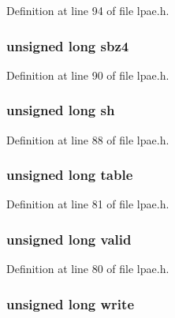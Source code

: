 \-Definition at line 94 of file lpae.\-h.

\hypertarget{structlpae__p2m__t_a38ba2ebd33232186b46dd6c586cdef25}{
\subsubsection[{sbz4}]{\setlength{\rightskip}{0pt plus 5cm}unsigned long {\bf sbz4}}}\label{structlpae__p2m__t_a38ba2ebd33232186b46dd6c586cdef25}


\-Definition at line 90 of file lpae.\-h.

\hypertarget{structlpae__p2m__t_a8388cd14eb45903279fca66cedfa5ec7}{
\subsubsection[{sh}]{\setlength{\rightskip}{0pt plus 5cm}unsigned long {\bf sh}}}\label{structlpae__p2m__t_a8388cd14eb45903279fca66cedfa5ec7}


\-Definition at line 88 of file lpae.\-h.

\hypertarget{structlpae__p2m__t_afe6d8cf4d4c78126d82831e6d5ef5483}{
\subsubsection[{table}]{\setlength{\rightskip}{0pt plus 5cm}unsigned long {\bf table}}}\label{structlpae__p2m__t_afe6d8cf4d4c78126d82831e6d5ef5483}


\-Definition at line 81 of file lpae.\-h.

\hypertarget{structlpae__p2m__t_a7bcbc21e402fb9e3dc07789d414ef17c}{
\subsubsection[{valid}]{\setlength{\rightskip}{0pt plus 5cm}unsigned long {\bf valid}}}\label{structlpae__p2m__t_a7bcbc21e402fb9e3dc07789d414ef17c}


\-Definition at line 80 of file lpae.\-h.

\hypertarget{structlpae__p2m__t_aff1f8e39a81cacd30783afe206b0835e}{
\subsubsection[{write}]{\setlength{\rightskip}{0pt plus 5cm}unsigned long {\bf write}}}\label{structlpae__p2m__t_aff1f8e39a81cacd30783afe206b0835e}



